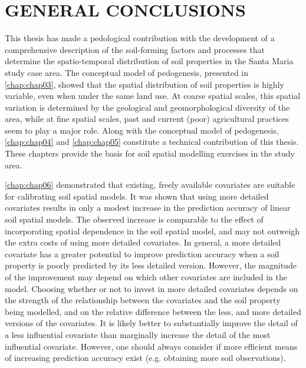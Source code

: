 \artigofalse
\chapter{GENERAL CONCLUSIONS}
\label{chap:chap10}

This thesis has made a pedological contribution with the development of a comprehensive description of the 
soil-forming factors and processes that determine the spatio-temporal distribution of soil properties in the 
Santa Maria study case area. The conceptual model of pedogenesis, presented in \autoref{chap:chap03}, showed 
that the spatial distribution of soil properties is highly variable, even when under the same land use. At 
coarse spatial scales, this spatial variation is determined by the geological and geomorphological diversity of 
the area, while at fine spatial scales, past and current (poor) agricultural practices seem to play a major 
role. Along with the conceptual model of pedogenesis, \autoref{chap:chap04} and \autoref{chap:chap05} 
constitute a technical contribution of this thesis. These chapters provide the basis for soil spatial modelling 
exercises in the study area.

\autoref{chap:chap06} demonstrated that existing, freely available covariates are suitable for calibrating soil 
spatial models. It was shown that using more detailed covariates results in only a modest increase in the 
prediction accuracy of linear soil spatial models. The observed increase is comparable to the effect of 
incorporating spatial dependence in the soil spatial model, and may not outweigh the extra costs of using more 
detailed covariates. In general, a more detailed covariate has a greater potential to improve 
prediction accuracy when a soil property is poorly predicted by its less detailed version. However, the 
magnitude of the improvement may depend on which other covariates are included in the model. Choosing whether 
or not to invest in more detailed covariates depends on the strength of the relationship between the covariates 
and the soil property being modelled, and on the relative difference between the less, and more detailed 
versions of the covariates. It is likely better to substantially improve the detail of a less influential 
covariate than marginally increase the detail of the most influential covariate. However, one should always 
consider if more efficient means of increasing prediction accuracy exist (e.g. obtaining more soil 
observations).

